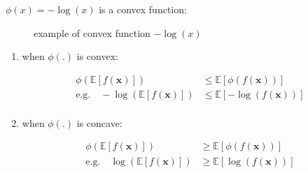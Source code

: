 \documentclass{article}
\def\x{{\mathbf x}}
\def\E{\mathbb{E}}
\def\E{{\mathbb{E}}}
\begin{document}
$\phi(x) = -\log(x)$ is a convex function:



\begin{figure}[H]
\begin{center}\label{fig:minus_log}
\caption{example of convex function $-\log(x)$}
\end{center}
\end{figure}




\begin{enumerate}
\item when $\phi(.)$ is convex:

\begin{equation}\begin{split}
 \phi  (\E[  f(\x) ]) &\le \E [\phi (f(\x))]\\
\text{e.g.}\quad  -\log ( \E[  f(\x) ] ) &\le \E [-\log (f(\x))]\\
\end{split}\end{equation}

\item when $\phi(.)$ is concave:


\begin{equation}\begin{split}
 \phi ( \E[  f(\x) ] ) &\ge \E [\phi (f(\x))]\\
\text{e.g.}\quad  \log ( \E[  f(\x) ] ) &\ge \E [ \log (f(\x))]\\
\end{split}\end{equation}

\end{enumerate}
\end{document}
